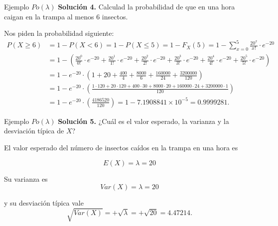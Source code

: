 \documentclass[
  ignorenonframetext,
  aspectratio=169]{beamer}
\begin{document}
\begin{frame}{Ejemplo \(Po(\lambda)\)}
\protect\hypertarget{ejemplo-polambda-5}{}
\textbf{Solución 4.} Calculad la probabilidad de que en una hora caigan
en la trampa al menos 6 insectos.

Nos piden la probabilidad siguiente: \[
\begin{array}{rl}
 P(X\geq 6)&=1- P(X<6)=1-P(X\leq 5)=1-F_X(5)=1-\displaystyle\sum_{x=0}^{5} \frac{20^{x}}{x!}\cdot e^{-20}\\
 &=
 1-\left(\frac{20^{0}}{0!}\cdot e^{-20}+\frac{20^{1}}{1!}\cdot e^{-20}+\frac{20^{2}}{2!}\cdot e^{-20}+\frac{20^{3}}{3!}\cdot e^{-20}+\frac{20^{4}}{4!}\cdot e^{-20}+\frac{20^{5}}{5!}\cdot e^{-20}\right)\\
 &=
 1-e^{-20}\cdot \left(1+20+\frac{400}{4}+\frac{8000}{6}+\frac{160000}{24}+\frac{3200000}{120}\right)\\
 &=
 1-e^{-20} \cdot \left(\frac{1 \cdot 120+20\cdot 120+400\cdot 30+8000\cdot 20+160000\cdot 24+3200000\cdot 1}{120}\right)\\
 &= 1-e^{-20}\cdot\left(\frac{4186520}{120}\right)=1-\ensuremath{7.1908841\times 10^{-5}} =0.9999281.
\end{array}
\]
\end{frame}

\begin{frame}{Ejemplo \(Po(\lambda)\)}
\protect\hypertarget{ejemplo-polambda-6}{}
\textbf{Solución 5.} ¿Cuál es el valor esperado, la varianza y la
desviación típica de \(X\)?

El valor esperado del número de insectos caídos en la trampa en una hora
es

\[E(X)=\lambda=20\]

Su varianza es \[Var(X)=\lambda=20\]

y su desviación típica vale
\[\sqrt{Var(X)}=+\sqrt{\lambda}=+\sqrt{20}=4.47214.\]
\end{frame}
\end{document}
